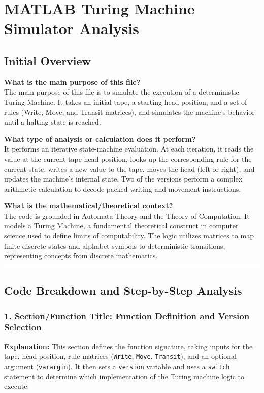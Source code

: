 
\chapter{MATLAB Turing Machine Simulator Analysis}
\date{}


\maketitle

\section*{Initial Overview}

\textbf{What is the main purpose of this file?}\\
The main purpose of this file is to simulate the execution of a deterministic Turing Machine. It takes an initial tape, a starting head position, and a set of rules (Write, Move, and Transit matrices), and simulates the machine's behavior until a halting state is reached.

\textbf{What type of analysis or calculation does it perform?}\\
It performs an iterative state-machine evaluation. At each iteration, it reads the value at the current tape head position, looks up the corresponding rule for the current state, writes a new value to the tape, moves the head (left or right), and updates the machine's internal state. Two of the versions perform a complex arithmetic calculation to decode packed writing and movement instructions.

\textbf{What is the mathematical/theoretical context?}\\
The code is grounded in Automata Theory and the Theory of Computation. It models a Turing Machine, a fundamental theoretical construct in computer science used to define limits of computability. The logic utilizes matrices to map finite discrete states and alphabet symbols to deterministic transitions, representing concepts from discrete mathematics.

\vspace{1em}
\hrule
\vspace{1em}

\section*{Code Breakdown and Step-by-Step Analysis}

\subsection*{1. Section/Function Title: Function Definition and Version Selection}
\textbf{Explanation:} This section defines the function signature, taking inputs for the tape, head position, rule matrices (\texttt{Write}, \texttt{Move}, \texttt{Transit}), and an optional argument (\texttt{varargin}). It then sets a \texttt{version} variable and uses a \texttt{switch} statement to determine which implementation of the Turing machine logic to execute.

